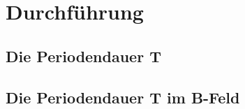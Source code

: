 \newpage
\section{Durchführung}
\subsection{Die Periodendauer T}
\subsection{Die Periodendauer T im B-Feld}
\label{sec:Durchführung}
